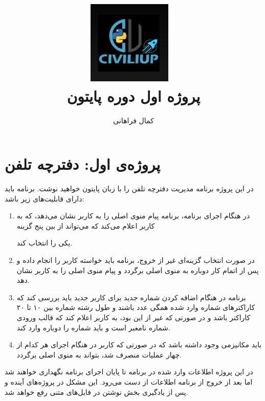 \documentclass{article}
\begin{document}
	\title{%
		\includegraphics[width=0.3\textwidth]{pics/python_civiliup.jpg}~ 
		\\
		پروژه اول دوره پایتون
	}
	\author{کمال فراهانی}
	\maketitle
	
	\section*{پروژه‌ی اول: دفترچه تلفن}
	در این پروژه برنامه مدیریت دفترچه تلفن را با زبان پایتون خواهید نوشت. برنامه باید دارای قابلیت‌های زیر باشد:
	\begin{enumerate}
		\item 
			در هنگام اجرای برنامه، برنامه پیام منوی اصلی را به کاربر نشان می‌دهد، که به کاربر اعلام می‌کند که می‌تواند از بین پنج گزینه
	یکی را انتخاب کند.
		\item	
	در صورت انتخاب گزینه‌ای غیر از خروج، برنامه باید خواسته کاربر را انجام داده و پس از اتمام کار دوباره به منوی اصلی برگردد و پیام منوی اصلی را به کاربر نشان دهد.
	
	\item 
	برنامه در هنگام اضافه کردن شماره جدید برای کاربر جدید باید بررسی کند که کاراکترهای شماره وارد شده همگی عدد باشند و طول رشته شماره بین ۱۰ تا ۲۰ کاراکتر باشد و در صورتی که غیر از این بود، به کاربر اعلام کند که قالب ورودی شماره نامعبر است و باید شماره را دوباره وارد کند.
	
	\item 
	باید مکانیزمی وجود داشته باشد که در صورتی که کاربر در هنگام اجرای هر کدام از چهار عملیات‌ منصرف شد، بتواند به منوی اصلی برگردد.
	\end{enumerate}

	در این پروژه اطلاعات وارد شده در برنامه تا پایان اجرای برنامه نگهداری خواهند شد اما بعد از خروج از برنامه اطلاعات از دست می‌رود. این مشکل در پروژه‌های آینده و پس از یادگیری بخش نوشتن در فایل‌های متنی رفع خواهد شد.
\end{document}
